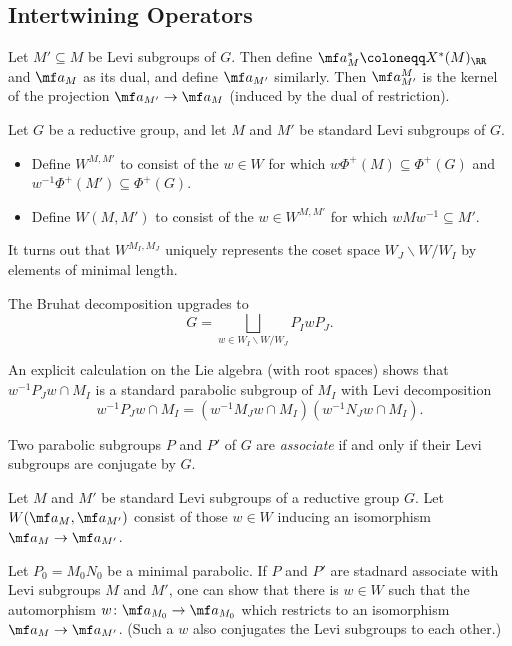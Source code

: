 \documentclass{article}
\begin{document}
\subsection{Intertwining Operators}
\begin{notation}
	Let $M'\subseteq M$ be Levi subgroups of $G$. Then define $\mf a_M^*\coloneqq X^*(M)_\RR$ and $\mf a_M$ as its dual, and define $\mf a_{M'}$ similarly. Then $\mf a_{M'}^{M}$ is the kernel of the projection $\mf a_{M'}\to\mf a_M$ (induced by the dual of restriction). 
\end{notation}
\begin{definition}
	Let $G$ be a reductive group, and let $M$ and $M'$ be standard Levi subgroups of $G$.
	\begin{itemize}
		\item Define $W^{M,M'}$ to consist of the $w\in W$ for which $w\Phi^+(M)\subseteq\Phi^+(G)$ and $w^{-1}\Phi^+(M')\subseteq\Phi^+(G)$.
		\item Define $W(M,M')$ to consist of the $w\in W^{M,M'}$ for which $wMw^{-1}\subseteq M'$.
	\end{itemize}
\end{definition}
\begin{remark}
	It turns out that $W^{M_I,M_J}$ uniquely represents the coset space $W_J\backslash W/W_I$ by elements of minimal length.
\end{remark}
\begin{remark}
	The Bruhat decomposition upgrades to
	\[G=\bigsqcup_{w\in W_I\backslash W/W_J}P_IwP_J.\]
\end{remark}
\begin{remark}
	An explicit calculation on the Lie algebra (with root spaces) shows that $w^{-1}P_Jw\cap M_I$ is a standard parabolic subgroup of $M_I$ with Levi decomposition
	\[w^{-1}P_Jw\cap M_I=\left(w^{-1}M_Jw\cap M_I\right)\left(w^{-1}N_Jw\cap M_I\right).\]
\end{remark}
\begin{definition}[associate]
	Two parabolic subgroups $P$ and $P'$ of $G$ are \textit{associate} if and only if their Levi subgroups are conjugate by $G$.
\end{definition}
\begin{notation}
	Let $M$ and $M'$ be standard Levi subgroups of a reductive group $G$. Let $W(\mf a_M,\mf a_{M'})$ consist of those $w\in W$ inducing an isomorphism $\mf a_M\to\mf a_{M'}$.
\end{notation}
\begin{remark}
	Let $P_0=M_0N_0$ be a minimal parabolic. If $P$ and $P'$ are stadnard associate with Levi subgroups $M$ and $M'$, one can show that there is $w\in W$ such that the automorphism $w\colon\mf a_{M_0}\to\mf a_{M_0}$ which restricts to an isomorphism $\mf a_M\to\mf a_{M'}$. (Such a $w$ also conjugates the Levi subgroups to each other.)
\end{remark}
\end{document}
